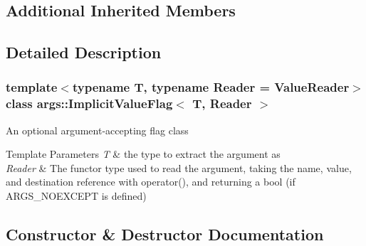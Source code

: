 \subsection*{Additional Inherited Members}


\subsection{Detailed Description}
\subsubsection*{template$<$typename T, typename Reader = Value\+Reader$>$\newline
class args\+::\+Implicit\+Value\+Flag$<$ T, Reader $>$}

An optional argument-\/accepting flag class


\begin{DoxyTemplParams}{Template Parameters}
{\em T} & the type to extract the argument as \\
\hline
{\em Reader} & The functor type used to read the argument, taking the name, value, and destination reference with operator(), and returning a bool (if A\+R\+G\+S\+\_\+\+N\+O\+E\+X\+C\+E\+PT is defined) \\
\hline
\end{DoxyTemplParams}


\subsection{Constructor \& Destructor Documentation}
\mbox{\label{classargs_1_1_implicit_value_flag_a666c1c0eca8615180da70ca76d446594}} 
